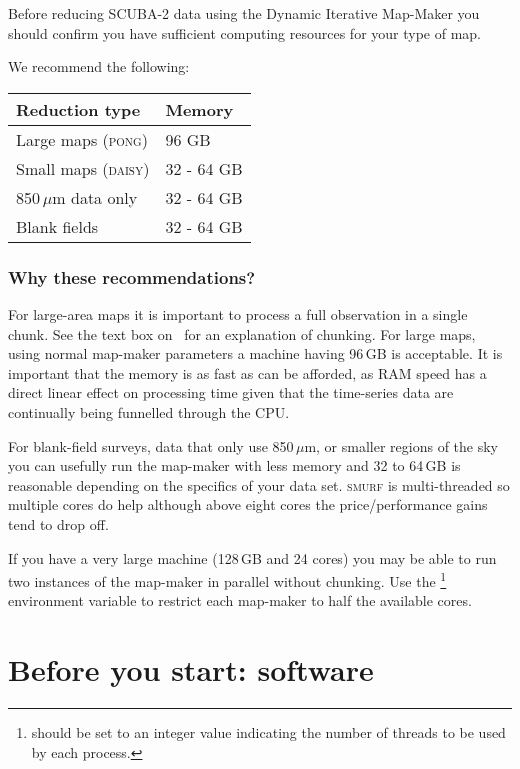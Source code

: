 Before reducing SCUBA-2 data using the Dynamic Iterative Map-Maker you should confirm you have sufficient computing resources for your type of map.

We recommend the following:
\begin{table}[h!]
  \centering
  \begin{tabular}{ll}
    \hline
    \textbf{Reduction type} &\textbf{Memory} \\
    \hline
    Large maps (\textsc{pong})& 96 GB\\
    Small maps (\textsc{daisy})&32 - 64 GB\\
    850\,$\mu$m data only&32 - 64 GB\\
    Blank fields&32 - 64 GB\\
    \hline
  \end{tabular}
\end{table}

\subsubsection*{Why these recommendations?}

For large-area maps it is important to process a full observation in a
single chunk. See the text box on
\
for an explanation of chunking. For large maps, using normal map-maker
parameters a machine having 96\,GB is acceptable. It is important that
the memory is as fast as can be afforded, as RAM speed has a direct
linear effect on processing time given that the time-series data are
continually being funnelled through the CPU.

For blank-field surveys, data that only use 850\,$\mu$m, or smaller
regions of the sky you can usefully run the map-maker with less memory
and 32 to 64\,GB is reasonable depending on the specifics of your data
set. \textsc{smurf} is multi-threaded so multiple cores do help
although above eight cores the price/performance gains tend to drop
off.

If you have a very large machine (128\,GB and 24 cores) you may be able
to run two instances of the map-maker in parallel without chunking. Use
the \footnote{\envvar{SMURF\_THREADS} should be
set to an integer value indicating the number of threads to be used by
each process.} environment variable to restrict each map-maker to half
the available cores.

\section{Before you start: software}

